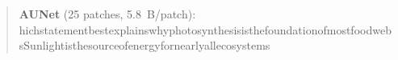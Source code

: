 \begin{quote}
\textbf{AUNet} (25 patches, 5.8~B/patch):\\[1pt]
\allowbreak{}h\allowbreak{}i\allowbreak{}c\allowbreak{}h\allowbreak{}\bb{\textvisiblespace{}}\allowbreak{}s\allowbreak{}t\allowbreak{}a\allowbreak{}t\allowbreak{}e\allowbreak{}m\allowbreak{}e\allowbreak{}n\allowbreak{}t\allowbreak{}\bb{\textvisiblespace{}}\allowbreak{}b\allowbreak{}e\allowbreak{}s\allowbreak{}t\allowbreak{}\bb{\textvisiblespace{}}\allowbreak{}e\allowbreak{}x\allowbreak{}p\allowbreak{}l\allowbreak{}a\allowbreak{}i\allowbreak{}n\allowbreak{}s\allowbreak{}\bb{\textvisiblespace{}}\allowbreak{}w\allowbreak{}h\allowbreak{}y\allowbreak{}\bb{\textvisiblespace{}}\allowbreak{}p\allowbreak{}h\allowbreak{}o\allowbreak{}t\allowbreak{}o\allowbreak{}s\allowbreak{}y\allowbreak{}n\allowbreak{}t\allowbreak{}h\allowbreak{}e\allowbreak{}s\allowbreak{}i\allowbreak{}s\allowbreak{}\bb{\textvisiblespace{}}\allowbreak{}i\allowbreak{}s\allowbreak{}\bb{\textvisiblespace{}}\allowbreak{}t\allowbreak{}h\allowbreak{}e\allowbreak{}\bb{\textvisiblespace{}}\allowbreak{}f\allowbreak{}o\allowbreak{}u\allowbreak{}n\allowbreak{}d\allowbreak{}a\allowbreak{}t\allowbreak{}i\allowbreak{}o\allowbreak{}n\allowbreak{}\bb{\textvisiblespace{}}\allowbreak{}o\allowbreak{}f\allowbreak{}\bb{\textvisiblespace{}}\allowbreak{}m\allowbreak{}o\allowbreak{}s\allowbreak{}t\allowbreak{}\bb{\textvisiblespace{}}\allowbreak{}f\allowbreak{}o\allowbreak{}o\allowbreak{}d\allowbreak{}\bb{\textvisiblespace{}}\allowbreak{}w\allowbreak{}e\allowbreak{}b\allowbreak{}s\allowbreak{}\allowbreak{}\bb{\textvisiblespace{}}\allowbreak{}S\allowbreak{}u\allowbreak{}n\allowbreak{}l\allowbreak{}i\allowbreak{}g\allowbreak{}h\allowbreak{}t\allowbreak{}\bb{\textvisiblespace{}}\allowbreak{}i\allowbreak{}s\allowbreak{}\bb{\textvisiblespace{}}\allowbreak{}t\allowbreak{}h\allowbreak{}e\allowbreak{}\bb{\textvisiblespace{}}\allowbreak{}s\allowbreak{}o\allowbreak{}u\allowbreak{}r\allowbreak{}c\allowbreak{}e\allowbreak{}\bb{\textvisiblespace{}}\allowbreak{}o\allowbreak{}f\allowbreak{}\bb{\textvisiblespace{}}\allowbreak{}e\allowbreak{}n\allowbreak{}e\allowbreak{}r\allowbreak{}g\allowbreak{}y\allowbreak{}\bb{\textvisiblespace{}}\allowbreak{}f\allowbreak{}o\allowbreak{}r\allowbreak{}\bb{\textvisiblespace{}}\allowbreak{}n\allowbreak{}e\allowbreak{}a\allowbreak{}r\allowbreak{}l\allowbreak{}y\allowbreak{}\bb{\textvisiblespace{}}\allowbreak{}a\allowbreak{}l\allowbreak{}l\allowbreak{}\bb{\textvisiblespace{}}\allowbreak{}e\allowbreak{}c\allowbreak{}o\allowbreak{}s\allowbreak{}y\allowbreak{}s\allowbreak{}t\allowbreak{}e\allowbreak{}m\allowbreak{}s\allowbreak{}\allowbreak{}\\[6pt]

\end{quote}
